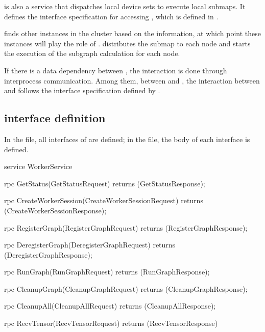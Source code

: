 \begin{content}

 is also a  service that dispatches local device sets to execute local submaps. It defines the interface specification for accessing , which is defined in .

 finds other  instances in the cluster based on the  information, at which point these  instances will play the role of .  distributes the submap to each  node and starts the execution of the subgraph calculation for each  node.

If there is a data dependency between , the interaction is done through interprocess communication. Among them, between  and , the interaction between  and  follows the interface specification defined by .

\subsection{interface definition}

In the  file, all interfaces of  are defined; in the  file, the body of each interface is defined.

\begin{leftbar}
\begin{c++}
service WorkerService {
  rpc GetStatus(GetStatusRequest) 
      returns (GetStatusResponse);

  rpc CreateWorkerSession(CreateWorkerSessionRequest)
      returns (CreateWorkerSessionResponse);

  rpc RegisterGraph(RegisterGraphRequest) 
      returns (RegisterGraphResponse);

  rpc DeregisterGraph(DeregisterGraphRequest) 
      returns (DeregisterGraphResponse);

  rpc RunGraph(RunGraphRequest) 
      returns (RunGraphResponse);

  rpc CleanupGraph(CleanupGraphRequest) 
      returns (CleanupGraphResponse);

  rpc CleanupAll(CleanupAllRequest) 
      returns (CleanupAllResponse);

  rpc RecvTensor(RecvTensorRequest) 
      returns (RecvTensorResponse) {
  }

}
\end{c++}
\end{leftbar}
\end{content}
